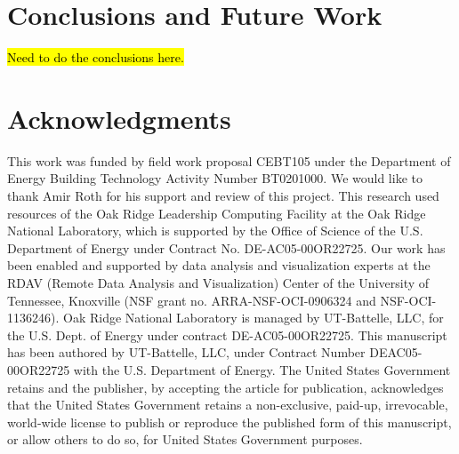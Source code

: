 \documentclass[preprint, review, 12pt]{elsarticle}
\begin{document}
\section{Conclusions and Future Work}
\label{sec:conclusions}

\hl{Need to do the conclusions here.}


\section{Acknowledgments}
This work was funded by field work proposal CEBT105 under the Department of Energy Building Technology Activity Number BT0201000. We would like to thank Amir Roth for his support and review of this project. This research used resources of the Oak Ridge Leadership Computing Facility at the Oak Ridge National Laboratory, which is supported by the Office of Science of the U.S. Department of Energy under Contract No. DE-AC05-00OR22725. Our work has been enabled and supported by data analysis and visualization experts at the RDAV (Remote Data Analysis and Visualization) Center of the University of Tennessee, Knoxville (NSF grant no. ARRA-NSF-OCI-0906324 and NSF-OCI-1136246). Oak Ridge National Laboratory is managed by UT-Battelle, LLC, for the U.S. Dept. of Energy under contract DE-AC05-00OR22725. This manuscript has been authored by UT-Battelle, LLC, under Contract Number DEAC05-00OR22725 with the U.S. Department of Energy. The United States Government retains and the publisher, by accepting the article for publication, acknowledges that the United States Government retains a non-exclusive, paid-up, irrevocable, world-wide license to publish or reproduce the published form of this manuscript, or allow others to do so, for United States Government purposes.














\end{document}

